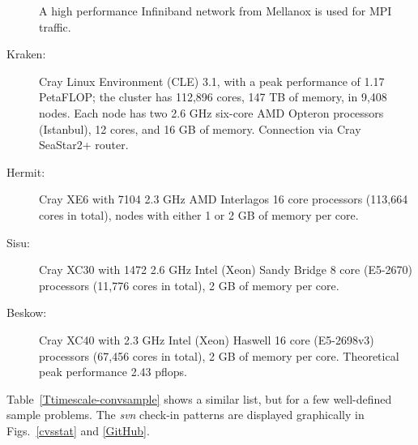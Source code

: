 \documentclass[\mydriver,12pt,twoside,notitlepage,a4paper]{article}
\makeatletter
\newcommand{\name}[2][]{%
  \def\index@{#1}%
  \textsl{#2\/}%
  \ifx\index@\@empty\index{#2@\MakeUppercase #2}%
  \else\index{#1}%
  \fi%
}
\makeatother
\begin{document}
\begin{description}
A high performance Infiniband network from Mellanox is used for MPI traffic.
\item[Kraken:] Cray Linux Environment (CLE) 3.1, with a peak performance of 1.17 PetaFLOP;
the cluster has 112,896 cores, 147 TB of memory, in 9,408 nodes.
Each node has two 2.6 GHz six-core AMD Opteron processors (Istanbul), 12 cores, and 16 GB of memory.
Connection via Cray SeaStar2+ router.
\item[Hermit:] Cray XE6 with 7104 2.3 GHz AMD Interlagos 16 core processors (113,664 cores in total), nodes with either 1 or 2 GB of memory per core.
\item[Sisu:] Cray XC30 with 1472 2.6 GHz Intel (Xeon) Sandy Bridge 8 core (E5-2670) processors (11,776 cores in total), 2 GB of memory per core.
\item[Beskow:] Cray XC40 with 2.3 GHz Intel (Xeon) Haswell 16 core
(E5-2698v3) processors (67,456 cores in total), 2 GB of memory per core.
Theoretical peak performance 2.43 pflops.

\end{description}

Table~\ref{Ttimescale-convsample} shows a similar list, but for a few
well-defined sample problems.
The \name{svn}  check-in patterns are displayed graphically
in Figs.~\ref{cvsstat} and \ref{GitHub}.
\end{document}

